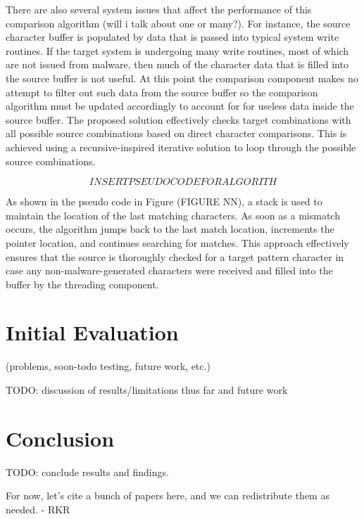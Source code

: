 \documentclass[times, 10pt,twocolumn]{article}
\begin{document}
There are also several system issues that affect the performance of this comparison algorithm (will i talk about one or many?). For instance, the source character buffer is populated by data that is passed into typical system write routines. If the target system is undergoing many write routines, most of which are not issued from malware, then much of the character data that is filled into the source buffer is not useful. At this point the comparison component makes no attempt to filter out such data from the source buffer so the comparison algorithm must be updated accordingly to account for for useless data inside the source buffer. The proposed solution effectively checks target combinations with all possible source combinations based on direct character comparisons. This is achieved using a recursive-inspired iterative solution to loop through the possible source combinations. 

\[INSERT PSEUDOCODE FOR ALGORITH\]

As shown in the pseudo code in Figure (FIGURE NN), a stack is used to maintain the location of the last matching characters. As soon as a mismatch occurs, the algorithm jumps back to the last match location, increments the pointer location, and continues searching for matches. This approach effectively ensures that the source is thoroughly checked for a target pattern character in case any non-malware-generated characters were received and filled into the buffer by the threading component. 

\section{Initial Evaluation}
\label{Initial Evaluation}
(problems, soon-todo testing, future work, etc.)

TODO: discussion of results/limitations thus far and future work

\section{Conclusion}
\label{Conclusion}
TODO: conclude results and findings.

For now, let's cite a bunch of papers here, and we can
redistribute them as needed. - RKR

\nocite{ Martignoni08-malicious, Shah06-covert,  Embleton08-SMM, Moffie06-trojans, Sagiroglu09-keyloggers, Yin07-panorama, Kabay05-malware,Hoglund05-rootkits,Hoglund04-exploit}






\small


\end{document}
